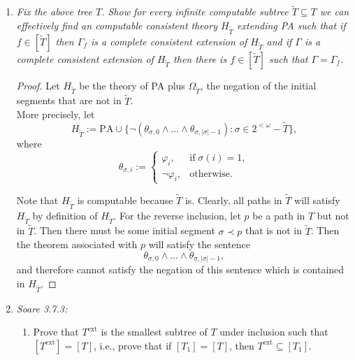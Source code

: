\documentclass{article}
\begin{document}
\begin{enumerate}[label={\bf Q\arabic*:}]
  \item \it Fix the above tree $T$. Show for every infinite computable
    subtree $\tilde{T}\subseteq T$ we can effectively find an computable
    consistent theory $H_{\tilde{T}}$ extending PA such that if
    $f\in[\tilde{T}]$ then $\Gamma_f$ is a complete consistent extension of
    $H_{\tilde{T}}$ and if $\Gamma$ is a complete consistent extension of
    $H_{\tilde{T}}$ then there is $f\in[\tilde{T}]$ such that
    $\Gamma=\Gamma_f$.

    \begin{proof}
      Let $H_{\tilde{T}}$ be the theory of PA plus $\Omega_{\tilde{T}}$,
      the negation of the initial segments that are not in $\tilde{T}$. \\

      More precisely, let
      \[H_{\tilde{T}} :=\text{PA} \cup \{\neg(\theta_{\sigma,0}
      \wedge\ldots \wedge\theta_{\sigma,|\sigma|-1}): \sigma\in
      2^{<\omega}-\tilde{T}\},\]
      where
      \begin{equation*}
        \theta_{\sigma,i} :=
        \begin{cases}
          \varphi_i, &\text{if}\; \sigma(i)=1,\\
          \neg\varphi_i, &\text{otherwise}.
        \end{cases}
      \end{equation*}

      Note that $H_{\tilde{T}}$ is computable because $\tilde{T}$ is.
      Clearly, all paths in $\tilde{T}$ will satisfy $H_{\tilde{T}}$ by
      definition of $H_{\tilde{T}}$. For the reverse inclusion, let $p$ be
      a path in $T$ but not in $\tilde{T}$. Then there must be some initial
      segment $\sigma\prec p$ that is not in $\tilde{T}$. Then the theorem
      associated with $p$ will satisfy the sentence \[\theta_{\sigma,0}
      \wedge\ldots \wedge\theta_{\sigma,|\sigma|-1},\] and therefore cannot
      satisfy the negation of this sentence which is contained in
      $H_{\tilde{T}}$.
    \end{proof}

  \item \it Soare 3.7.3:
    \begin{enumerate}
      \item Prove that $T^{\text{ext}}$ is the smallest subtree of $T$
        under inclusion such that $[T^{\text{ext}}]=[T]$, i.e., prove that
        if $[T_1]=[T]$, then $T^{\text{ext}}\subseteq[T_1]$.


\end{enumerate}
\end{enumerate}
\end{document}
